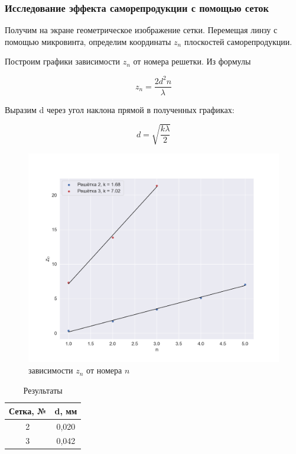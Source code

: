 \documentclass[a4paper, 12pt]{article}
\begin{document}
\subsubsection*{Исследование эффекта саморепродукции с помощью сеток}

Получим на экране геометрическое изображение сетки. Перемещая линзу с помощью микровинта, определим координаты $z_n$ плоскостей саморепродукции.

Построим графики зависимости $z_n$ от номера решетки. Из формулы 

\begin{equation}
	z_n = \frac{2d^2n}{\lambda}
\end{equation}

Выразим d через угол наклона прямой в полученных графиках:

\begin{equation}
	d = \sqrt{\frac{k\lambda}{2}}
\end{equation}

\begin{figure}[H]
    \centering
    \includegraphics[width=1\textwidth]{plot1.png}
    \caption{зависимости $z_n$ от номера $n$}
    \label{fig:plo1}
\end{figure}

\begin{table}[H]
	\centering
	\begin{tabular}{|c|c|}
	\hline
	\textbf{Сетка, №} & \textbf{d, мм} \\ \hline
	2                 & 0,020           \\ \hline
	3                 & 0,042          \\ \hline
	\end{tabular}
	\caption{Результаты}
	\label{tab:res2}
	\end{table}
\end{document}
